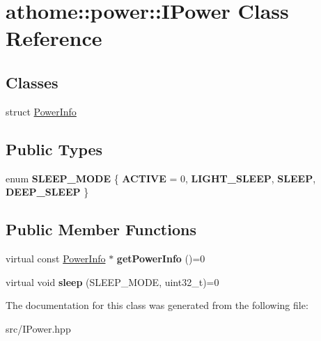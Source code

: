 \hypertarget{classathome_1_1power_1_1_i_power}{}\section{athome\+:\+:power\+:\+:I\+Power Class Reference}
\label{classathome_1_1power_1_1_i_power}
\subsection*{Classes}
\begin{DoxyCompactItemize}
\item 
struct \mbox{\hyperlink{structathome_1_1power_1_1_i_power_1_1_power_info}{Power\+Info}}
\end{DoxyCompactItemize}
\subsection*{Public Types}
\begin{DoxyCompactItemize}
\item 
\mbox{\label{classathome_1_1power_1_1_i_power_a0d23b118e64d97d708f2c6d153310107}} 
enum {\bfseries S\+L\+E\+E\+P\+\_\+\+M\+O\+DE} \{ {\bfseries A\+C\+T\+I\+VE} = 0, 
{\bfseries L\+I\+G\+H\+T\+\_\+\+S\+L\+E\+EP}, 
{\bfseries S\+L\+E\+EP}, 
{\bfseries D\+E\+E\+P\+\_\+\+S\+L\+E\+EP}
 \}
\end{DoxyCompactItemize}
\subsection*{Public Member Functions}
\begin{DoxyCompactItemize}
\item 
\mbox{\label{classathome_1_1power_1_1_i_power_a2b5a55274b0ad8619d9283a80063a4df}} 
virtual const \mbox{\hyperlink{structathome_1_1power_1_1_i_power_1_1_power_info}{Power\+Info}} $\ast$ {\bfseries get\+Power\+Info} ()=0
\item 
\mbox{\label{classathome_1_1power_1_1_i_power_ab6ff871c84bf451acbf11fa524193e2c}} 
virtual void {\bfseries sleep} (S\+L\+E\+E\+P\+\_\+\+M\+O\+DE, uint32\+\_\+t)=0
\end{DoxyCompactItemize}


The documentation for this class was generated from the following file\+:\begin{DoxyCompactItemize}
\item 
src/I\+Power.\+hpp\end{DoxyCompactItemize}
